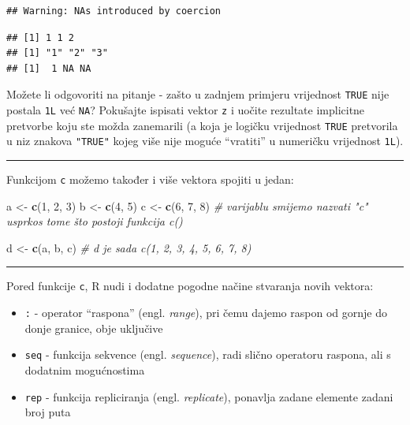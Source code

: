 \documentclass[]{book}
\newenvironment{Shaded}{\begin{snugshade}}{\end{snugshade}}
\newcommand{\KeywordTok}[1]{\textcolor[rgb]{0.13,0.29,0.53}{\textbf{#1}}}
\newcommand{\DecValTok}[1]{\textcolor[rgb]{0.00,0.00,0.81}{#1}}
\newcommand{\StringTok}[1]{\textcolor[rgb]{0.31,0.60,0.02}{#1}}
\newcommand{\CommentTok}[1]{\textcolor[rgb]{0.56,0.35,0.01}{\textit{#1}}}
\newcommand{\NormalTok}[1]{#1}
\providecommand{\tightlist}{%
  \setlength{\itemsep}{0pt}\setlength{\parskip}{0pt}}
\theoremstyle{definition}
\theoremstyle{definition}
\theoremstyle{definition}
\theoremstyle{remark}
\begin{document}
\begin{verbatim}
## Warning: NAs introduced by coercion
\end{verbatim}

\begin{verbatim}
## [1] 1 1 2
## [1] "1" "2" "3"
## [1]  1 NA NA
\end{verbatim}

Možete li odgovoriti na pitanje - zašto u zadnjem primjeru vrijednost
\texttt{TRUE} nije postala \texttt{1L} već \texttt{NA}? Pokušajte
ispisati vektor \texttt{z} i uočite rezultate implicitne pretvorbe koju
ste možda zanemarili (a koja je logičku vrijednost \texttt{TRUE}
pretvorila u niz znakova \texttt{"TRUE"} kojeg više nije moguće
``vratiti'' u numeričku vrijednost \texttt{1L}).

\begin{center}\rule{0.5\linewidth}{\linethickness}\end{center}

Funkcijom \texttt{c} možemo također i više vektora spojiti u jedan:

\begin{Shaded}
\begin{Highlighting}[]
\NormalTok{a <-}\StringTok{ }\KeywordTok{c}\NormalTok{(}\DecValTok{1}\NormalTok{, }\DecValTok{2}\NormalTok{, }\DecValTok{3}\NormalTok{)}
\NormalTok{b <-}\StringTok{ }\KeywordTok{c}\NormalTok{(}\DecValTok{4}\NormalTok{, }\DecValTok{5}\NormalTok{)}
\NormalTok{c <-}\StringTok{ }\KeywordTok{c}\NormalTok{(}\DecValTok{6}\NormalTok{, }\DecValTok{7}\NormalTok{, }\DecValTok{8}\NormalTok{)   }\CommentTok{# varijablu smijemo nazvati "c" usprkos tome što postoji funkcija c()}

\NormalTok{d <-}\StringTok{ }\KeywordTok{c}\NormalTok{(a, b, c)   }\CommentTok{# d je sada c(1, 2, 3, 4, 5, 6, 7, 8)}
\end{Highlighting}
\end{Shaded}

\begin{center}\rule{0.5\linewidth}{\linethickness}\end{center}

Pored funkcije \texttt{c}, R nudi i dodatne pogodne načine stvaranja
novih vektora:

\begin{itemize}
\tightlist
\item
  \texttt{:} - operator ``raspona'' (engl. \emph{range}), pri čemu
  dajemo raspon od gornje do donje granice, obje uključive
\item
  \texttt{seq} - funkcija sekvence (engl. \emph{sequence}), radi slično
  operatoru raspona, ali s dodatnim mogućnostima
\item
  \texttt{rep} - funkcija repliciranja (engl. \emph{replicate}),
  ponavlja zadane elemente zadani broj puta
\end{itemize}
\end{document}
